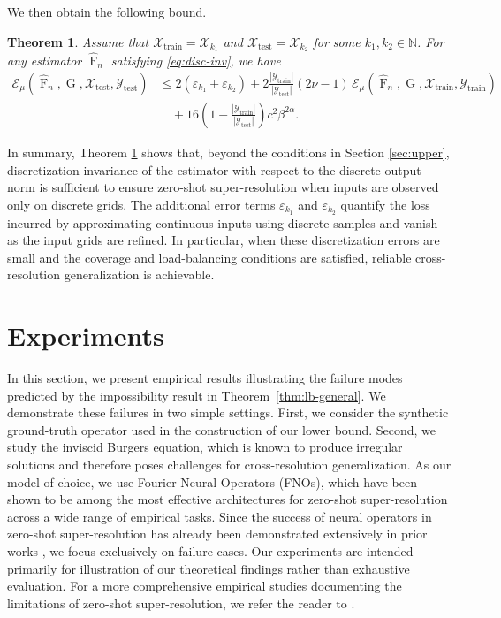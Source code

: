 \documentclass[11pt]{article}
\theoremstyle{plain}
\newtheorem{theorem}{Theorem}
\newcommand{\naturals}{\mathbb{N}}
\newcommand{\Xcal}{\mathcal{X}}
\newcommand{\Ycal}{\mathcal{Y}}
\newcommand{\Ecal}{\mathcal{E}}
\begin{document}
\medskip

We then obtain the following bound.
\begin{theorem}
\label{thm:ub-discreteinp}
Assume that $\Xcal_{\mathrm{train}} = \Xcal_{k_1}$ and $\Xcal_{\mathrm{test}} = \Xcal_{k_2}$ for some
$k_1, k_2 \in \naturals$. For any estimator $\widehat{\operatorname{F}}_n$ satisfying
\eqref{eq:disc-inv}, we have
\[
\begin{aligned}
\Ecal_{\mu} \left(
\widehat{\operatorname{F}}_n, \operatorname{G},
\Xcal_{\mathrm{test}}, \Ycal_{\mathrm{test}}
\right)
&\le
2(\varepsilon_{k_1} + \varepsilon_{k_2})
+
2 \frac{|\Ycal_{\mathrm{train}}|}{|\Ycal_{\mathrm{test}}|}
(2\nu - 1)\,
\Ecal_{\mu}\!\left(
\widehat{\operatorname{F}}_n, \operatorname{G},
\Xcal_{\mathrm{train}}, \Ycal_{\mathrm{train}}
\right)
\\
&\quad
+
16\left(
1 - \frac{|\Ycal_{\mathrm{train}}|}{|\Ycal_{\mathrm{test}}|}
\right)
c^2 \beta^{2\alpha}.
\end{aligned}
\]
\end{theorem}

\noindent
In summary, Theorem \ref{thm:ub-discreteinp} shows that, beyond the conditions in
Section \ref{sec:upper}, discretization invariance of the estimator with respect to the discrete
output norm is sufficient to ensure zero-shot super-resolution when inputs are observed only on
discrete grids. The additional error terms $\varepsilon_{k_1}$ and $\varepsilon_{k_2}$ quantify the
loss incurred by approximating continuous inputs using discrete samples and vanish as the input
grids are refined. In particular, when these discretization errors are small and the coverage and
load-balancing conditions are satisfied, reliable cross-resolution generalization is achievable.




\section{Experiments}

In this section, we present empirical results illustrating the failure modes predicted by the
impossibility result in Theorem~\ref{thm:lb-general}. We demonstrate these failures in two simple
settings. First, we consider the synthetic ground-truth operator used in the
construction of our lower bound. Second, we study the inviscid Burgers equation, which is known to
produce irregular solutions and therefore poses challenges for cross-resolution generalization. As our model of choice, we use Fourier Neural Operators (FNOs), which have been shown to be among
the most effective architectures for zero-shot super-resolution across a wide range of empirical
tasks. Since the success of neural operators in zero-shot super-resolution has already been
demonstrated extensively in prior works
\citep{li2020fourier, jiang2023efficient, luo2024hierarchical, yang2024fourier, yasuda2025zero,
sinha2025effectiveness}, we focus exclusively on failure
cases. Our experiments are intended primarily for illustration of our theoretical findings rather than exhaustive evaluation.
For a more comprehensive empirical studies documenting the limitations of zero-shot super-resolution,
we refer the reader to \citep{sakarvadia2025false, gao2025discretization}.
\end{document}
